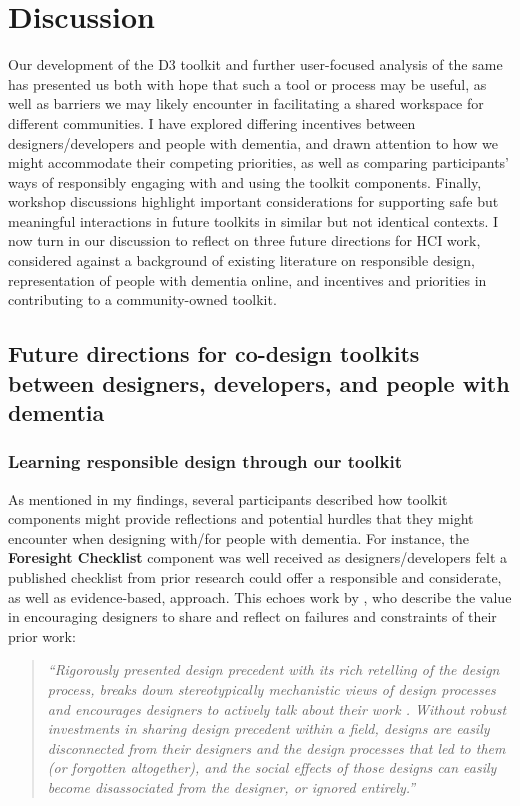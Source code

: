 \section{Discussion}
\label{D3:Discussion}
Our development of the D3 toolkit and further user-focused analysis of the same has presented us both with hope that such a tool or process may be useful, as well as barriers we may likely encounter in facilitating a shared workspace for different communities. I have explored differing incentives between designers/developers and people with dementia, and drawn attention to how we might accommodate their competing priorities, as well as comparing participants’ ways of responsibly engaging with and using the toolkit components. Finally, workshop discussions highlight important considerations for supporting safe but meaningful interactions in future toolkits in similar but not identical contexts. I now turn in our discussion to reflect on three future directions for HCI work, considered against a background of existing literature on responsible design, representation of people with dementia online, and incentives and priorities in contributing to a community-owned toolkit.

\subsection{Future directions for co-design toolkits between designers, developers, and people with dementia}

\subsubsection{Learning responsible design through our toolkit}
As mentioned in my findings, several participants described how toolkit components might provide reflections and potential hurdles that they might encounter when designing with/for people with dementia. For instance, the \textbf{Foresight Checklist} component was well received as designers/developers felt a published checklist from prior research could offer a responsible and considerate, as well as evidence-based, approach. This echoes work by \cite{gray2016inscribing}, who describe the value in encouraging designers to share and reflect on failures and constraints of their prior work:

\begin{quote}
    
\textit{``Rigorously presented design precedent with its rich retelling of the design process, breaks down stereotypically mechanistic views of design processes and encourages designers to actively talk about their work \citep{boling2015designerly,smith2010producing}. Without robust investments in sharing design precedent within a field, designs are easily disconnected from their designers and the design processes that led to them (or forgotten altogether), and the social effects of those designs can easily become disassociated from the designer, or ignored entirely.'' \citep[pg.993]{gray2016inscribing}}
\end{quote}

